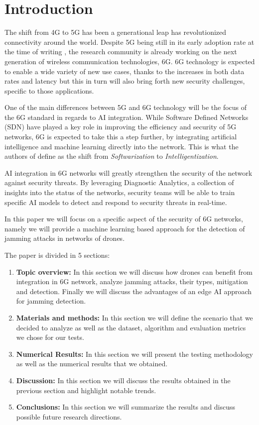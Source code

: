 \documentclass[futureinternet,article,submit,pdftex,moreauthors]{Definitions/mdpi}
\begin{document}
\section{Introduction}

The shift from 4G to 5G has been a generational leap has revolutionized connectivity around the world. 
Despite 5G being still in its early adoption rate at the time of writing \cite{5GStatisticsTaylor}, the research community is already working on the next generation of wireless communication technologies, 6G. 
6G technology is expected to enable a wide variety of new use cases, thanks to the increases in both data rates and latency but this in turn 
will also bring forth new security challenges, specific to those applications. 

One of the main differences between 5G and 6G technology will be the focus of the 6G standard in regards to 
AI integration. While Software Defined Networks (SDN) have played a key role in improving the efficiency and security 
of 5G networks, 6G is expected to take this a step further, by integrating artificial
intelligence and machine learning directly into the network. This is what the authors of \cite{6GRoadmapLetaief} define as 
the shift from \textit{Softwarization} to \textit{Intelligentization}.

AI integration in 6G networks will greatly strengthen the security of the network against security threats. 
By leveraging Diagnostic Analytics, a collection of insights into the status of the networks, security teams 
will be able to train specific AI models to detect and respond to security threats in real-time.

In this paper we will focus on a specific aspect of the security of 6G networks, namely we will provide a machine learning based approach 
for the detection of jamming attacks in networks of drones. 

The paper is divided in 5 sections: 
\begin{enumerate}
	\item \textbf{Topic overview:} In this section we will discuss how drones can benefit from integration in 6G network, analyze jamming attacks, their types, mitigation and detection. Finally we will discuss the advantages of an edge AI approach for jamming detection. 
	\item \textbf{Materials and methods:} In this section we will define the scenario that we decided to analyze as well as the dataset, algorithm and evaluation metrics we chose for our tests. 
	\item \textbf{Numerical Results:} In this section we will present the testing methodology as well as the numerical results that we obtained. 
	\item \textbf{Discussion:} In this section we will discuss the results obtained in the previous section and highlight notable trends.
	\item \textbf{Conclusions:} In this section we will summarize the results and discuss possible future research directions.
\end{enumerate}
\end{document}
